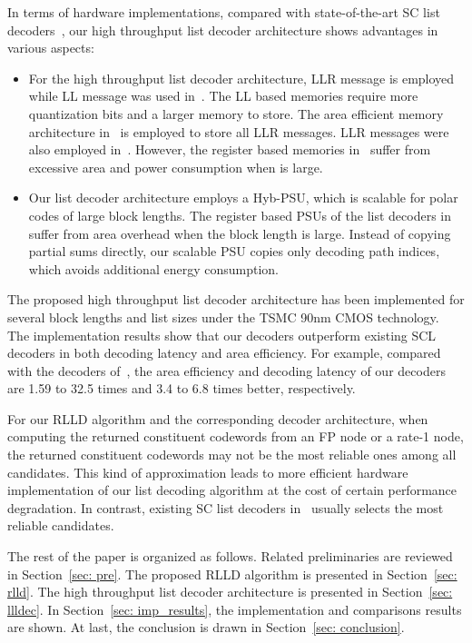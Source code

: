 \documentclass[journal]{IEEEtran}
\begin{document}
In terms of hardware implementations, compared with state-of-the-art SC list decoders~\cite{tree_list_dec, jun_low_mem_list, llr_list_tsp,llr_list, yuan_low_latency, chenrong_tsp}, our high throughput list decoder architecture shows advantages in various aspects:
\begin{itemize}
\item For the high throughput list decoder architecture, LLR message is employed while LL message was used in~\cite{tree_list_dec, jun_low_mem_list, yuan_low_latency, chenrong_tsp}. The LL based memories require more quantization bits and a larger memory to store. The area efficient memory architecture in~\cite{jun_low_mem_list} is employed to store all LLR messages. LLR messages were also employed in~\cite{llr_list_tsp,llr_list}. However, the register based memories in~\cite{llr_list_tsp, llr_list} suffer from excessive area and power consumption when  is large.
\item Our list decoder architecture employs a Hyb-PSU, which is scalable for polar codes of large block lengths. The register based PSUs of the list decoders in~\cite{llr_list_tsp, jun_low_mem_list,tree_list_dec} suffer from area overhead when the block length is large. Instead of copying partial sums directly, our scalable PSU copies only decoding path indices, which avoids additional energy consumption.
\end{itemize}
The proposed high throughput list decoder architecture has been implemented for several block lengths and list sizes under the TSMC 90nm CMOS technology. The implementation results show that our decoders outperform existing SCL decoders in both decoding latency and area efficiency. For example, compared with the decoders of~\cite{llr_list_tsp}, the area efficiency and decoding latency of our decoders are 1.59 to 32.5 times and 3.4 to 6.8 times better, respectively.

For our RLLD algorithm and the corresponding decoder architecture, when computing the returned constituent codewords from an FP node or a rate-1 node, the returned  constituent codewords may not be the  most reliable ones among all candidates. This kind of approximation leads to more efficient hardware implementation of our list decoding algorithm at the cost of certain performance degradation. In contrast, existing SC list decoders in~\cite{ido_it,llr_list} usually selects the  most reliable candidates.

The rest of the paper is organized as follows. Related preliminaries are reviewed in Section~\ref{sec: pre}. The proposed RLLD algorithm is presented in Section~\ref{sec: rlld}. The high throughput list decoder architecture is presented in Section~\ref{sec: llldec}. In Section~\ref{sec: imp_results}, the implementation and comparisons results are shown. At last, the conclusion is drawn in Section~\ref{sec: conclusion}.
\end{document}
